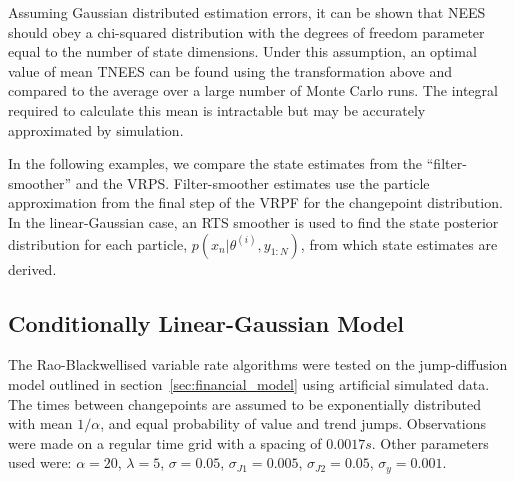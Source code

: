 \documentclass[peerreview,11pt,draftcls,onecolumn]{IEEEtran}
\begin{document}
Assuming Gaussian distributed estimation errors, it can be shown that NEES should obey a chi-squared distribution with the degrees of freedom parameter equal to the number of state dimensions. Under this assumption, an optimal value of mean TNEES can be found using the transformation above and compared to the average over a large number of Monte Carlo runs. The integral required to calculate this mean is intractable but may be accurately approximated by simulation.

In the following examples, we compare the state estimates from the ``filter-smoother'' \cite{Kitagawa1996} and the VRPS. Filter-smoother estimates use the particle approximation from the final step of the VRPF for the changepoint distribution. In the linear-Gaussian case, an RTS smoother is used to find the state posterior distribution for each particle, $p(x_n|\theta^{(i)}, y_{1:N})$, from which state estimates are derived.





\subsection{Conditionally Linear-Gaussian Model} \label{sec:finance}

The Rao-Blackwellised variable rate algorithms were tested on the jump-diffusion model outlined in section~\ref{sec:financial_model} using artificial simulated data. The times between changepoints are assumed to be exponentially distributed with mean $1/\alpha$, and equal probability of value and trend jumps. Observations were made on a regular time grid with a spacing of $0.0017s$. Other parameters used were: $\alpha = 20$, $\lambda = 5$, $\sigma = 0.05$, $\sigma_{J1} = 0.005$, $\sigma_{J2} = 0.05$, $\sigma_{y} = 0.001$.
\end{document}

